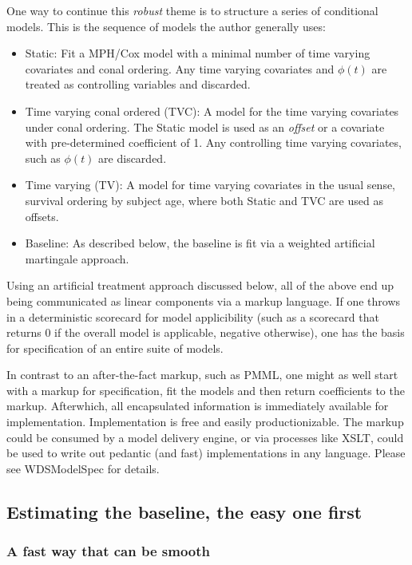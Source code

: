 \documentclass[10pt]{article}
\begin{document}
One way to continue this {\em robust} theme is to structure a series of conditional models.  This is the sequence of 
models the author generally uses:
\begin{itemize}
\item Static:  Fit a MPH/Cox model with a minimal number of time varying covariates and conal ordering.  Any time varying covariates and $\phi(t)$ 
    are treated as controlling variables and discarded.
\item Time varying conal ordered (TVC):
    A model for the time varying covariates under conal ordering.
    The Static model is used as an {\em offset} or a covariate with pre-determined coefficient of 1.
        Any controlling time varying covariates, such as $\phi(t)$ are discarded.
\item Time varying (TV): 
    A model for time varying covariates in the usual sense, survival ordering by subject age, where both Static and TVC are used as offsets.
\item Baseline:
    As described below, the baseline is fit via a weighted artificial martingale approach. 
\end{itemize}

Using an artificial treatment approach discussed below, all of the above end up being communicated as linear components via a
markup language.  If one throws in a deterministic scorecard for model applicibility (such as a scorecard that returns 0 if the overall model is
applicable, negative otherwise), one has the basis for specification of an entire suite of models.  

In contrast to an after-the-fact markup, such as PMML, one might as well start with a markup for specification, fit the models and then return coefficients to the markup.  
Afterwhich, all encapsulated information is immediately available for implementation.  
Implementation is free and easily productionizable.  The markup could be consumed by a model delivery engine, or via processes like XSLT,
could be used to write out pedantic (and fast) implementations in any language.  Please see WDSModelSpec for details.

\subsection{Estimating the baseline, the easy one first}

\subsubsection{A fast way that can be smooth}
\end{document}
